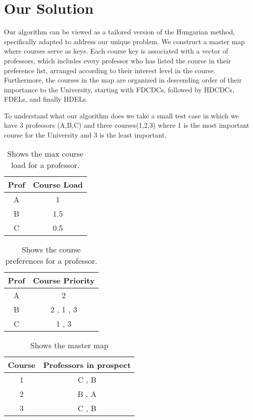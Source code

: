 \documentclass[12pt, letterpaper]{article}
\begin{document}
\section{Our Solution}
Our algorithm can be viewed as a tailored version of the Hungarian method, specifically adapted to address our unique problem. We construct a master map where courses serve as keys. Each course key is associated with a vector of professors, which includes every professor who has listed the course in their preference list, arranged according to their interest level in the course. Furthermore, the courses in the map are organized in descending order of their importance to the University, starting with FDCDCs, followed by HDCDCs, FDELs, and finally HDELs.

To understand what our algorithm does we take a small test case in which we have 3 professors (A,B,C) and three courses(1,2,3) where 1 is the most important course for the University and 3 is the least important.


\begin{table}[ht!]
\centering
\begin{tabular}{||c c ||} 
 \hline
 Prof & Course Load \\ [0.5ex] 
 \hline\hline
 A & 1  \\ 
 B & 1.5  \\
 C & 0.5  \\ [1ex] 
 \hline
\end{tabular}
\caption{Shows the max course load for a professor.}
\label{Table 1}
\end{table}

\begin{table}[ht!]
\centering
\begin{tabular}{||c c ||} 
 \hline
 Prof & Course Priority \\ [0.5ex] 
 \hline\hline
 A & 2  \\ 
 B & 2 , 1 , 3  \\
 C & 1 , 3  \\ [1ex] 
 \hline
\end{tabular}
\caption{Shows the course preferences for a professor.}
\label{Table 2}
\end{table}

\begin{table}[ht!]
\centering
\begin{tabular}{||c c ||} 
 \hline
 Course & Professors in prospect \\ [0.5ex] 
 \hline\hline
 1 & C , B  \\ 
 2 & B , A  \\
 3 & C , B \\ [1ex] 
 \hline
\end{tabular}
\caption{Shows the master map }
\label{Table 3}
\end{table}
\end{document}
